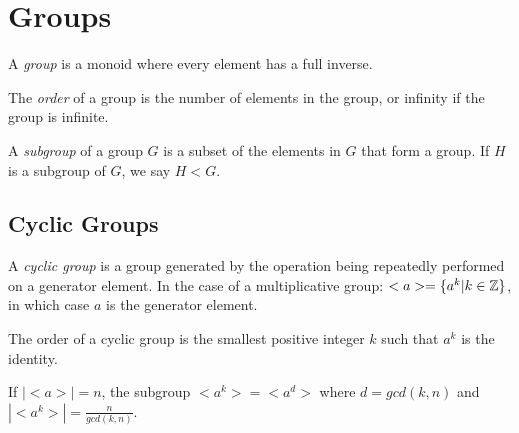 \chapter{Groups}

A \emph{group} is a monoid where every element has a full inverse.

The \emph{order} of a group is the number of elements in the group, or
infinity if the group is infinite.

A \emph{subgroup} of a group $G$ is a subset of the elements in $G$
that form a group.  If $H$ is a subgroup of $G$, we say $H < G$.

\section{Cyclic Groups}

A \emph{cyclic group} is a group generated by the operation being
repeatedly performed on a generator element.  In the case of a
multiplicative group: $<a> = \{ a^k | k \in \mathbb{Z} \}$, in which case $a$
is the generator element.

The order of a cyclic group is the smallest positive integer $k$ such
that $a^k$ is the identity.

If $|<a>| = n$, the subgroup $<a^k> = <a^d>$ where $d = gcd(k,n)$ and
$|<a^k>| = \frac{n}{gcd(k,n)}$.
